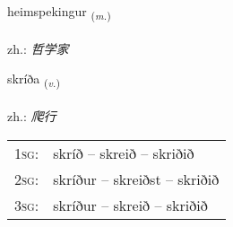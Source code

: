 \documentclass[frontgrid, backgrid]{flacards}\usepackage[]{graphicx}\usepackage[]{xcolor}
\begin{document}
\renewcommand{\flhead}{\vskip5pt \fboxsep=0pt {\small\bfseries\footnotesize Nafnorð | 名词}}
\renewcommand{\fcfoot}{\vskip5pt \fboxsep=0pt \hspace{2pt}{\small\bfseries\footnotesize 3K}}

\renewcommand{\blhead}{\vskip5pt {\small\bfseries\footnotesize Nafnorð | 名词 }}
\renewcommand{\bcfoot}{\vskip5pt \hspace{2pt}{\small\bfseries\footnotesize 3K}}


{heimspekingur \small{\textsubscript{(\textit{m.})}} \\[1ex] %
\textphonetic{[heimspɛciŋkʏr]} \\
zh.: \emph{哲学家} \\  [2ex]
\renewcommand*{\arraystretch}{0.8}
}

\renewcommand{\flhead}{\vskip5pt \fboxsep=0pt {\small\bfseries\footnotesize Sagnorð | 动词}}
\renewcommand{\fcfoot}{\vskip5pt \fboxsep=0pt \hspace{2pt}{\small\bfseries\footnotesize 3K}}

\renewcommand{\blhead}{\vskip5pt {\small\bfseries\footnotesize Sagnorð | 动词 }}
\renewcommand{\bcfoot}{\vskip5pt \hspace{2pt}{\small\bfseries\footnotesize 3K}}


{skríða \small{\textsubscript{(\textit{v.})}} \\[1ex] %
\textphonetic{[skriːða]} \\
zh.: \emph{爬行} \\  [2ex]
\renewcommand*{\arraystretch}{0.8}
\begin{tabular}{p{1cm}l}
\textsc{1sg}: & skríð -- skreið -- skriðið \\ 
\textsc{2sg}: & skríður -- skreiðst -- skriðið \\ 
\textsc{3sg}: & skríður -- skreið -- skriðið \\ 
\end{tabular}
}
\end{document}
